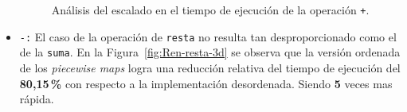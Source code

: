\begin{itemize}
    \begin{table}[ht]
    \centering
    \caption{Cuadro de escalado del tiempo de ejecución de la operación \texttt{+}}
    \label{tab:suma-esc}
    \end{table}

    \begin{figure}[htbp]
          \centering
          \caption{Análisis del escalado en el tiempo de ejecución de la operación \texttt{+}.}
          \label{fig:suma-esc}
    \end{figure}



    \item \texttt{-:} 
    El caso de la operación de \texttt{resta} no resulta tan desproporcionado como el 
    de la \texttt{suma}. En la Figura~\ref{fig:Ren-resta-3d} se observa que la versión 
    ordenada de los \textit{piecewise maps} logra una reducción relativa del tiempo de 
    ejecución del \textbf{80{,}15\,\%} con respecto a la implementación desordenada. Siendo \textbf{5} veces mas rápida.



\end{itemize}
